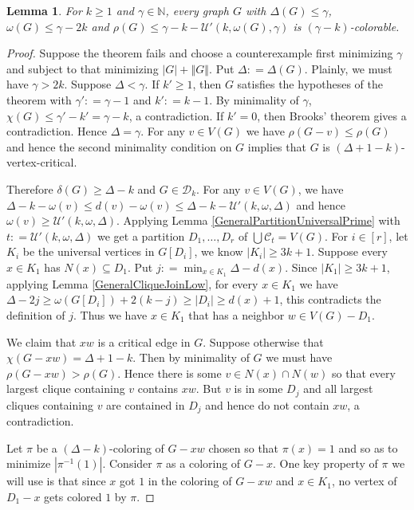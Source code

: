 \documentclass[12pt]{article}
\theoremstyle{plain}
\newtheorem{lem}[thm]{Lemma}
\theoremstyle{definition}
\theoremstyle{remark}
\newcommand{\fancy}[1]{\mathcal{#1}}
\newcommand{\IN}{\mathbb{N}}
\newcommand{\CC}{\fancy{C}}
\newcommand{\D}{\fancy{D}}
\newcommand{\card}[1]{\left|#1\right|}
\newcommand{\size}[1]{\left\Vert#1\right\Vert}
\newcommand{\irange}[1]{\left[#1\right]}
\newcommand{\DefinedAs}{\mathrel{\mathop:}=}
\def\D{\fancy{D}}
\begin{document}
\begin{lem}
For $k \geq 1$ and $\gamma \in \IN$, every graph $G$ with $\Delta(G) \leq \gamma$, $\omega(G) \leq \gamma - 2k$ and $\rho(G) \leq \gamma - k - \fancy{U}'(k, \omega(G), \gamma)$ is $(\gamma-k)$-colorable.
\end{lem}
\begin{proof}
Suppose the theorem fails and choose a counterexample first minimizing $\gamma$ and subject to that minimizing $\card{G} + \size{G}$. Put $\Delta \DefinedAs \Delta(G)$.  Plainly, we must have $\gamma > 2k$. Suppose $\Delta < \gamma$.  If $k' \geq 1$, then $G$ satisfies the hypotheses of the theorem with $\gamma' \DefinedAs \gamma - 1$ and $k' \DefinedAs k-1$.  By minimality of $\gamma$, $\chi(G) \leq \gamma'-k' = \gamma - k$, a contradiction.  If $k' = 0$, then Brooks' theorem gives a contradiction.  Hence $\Delta = \gamma$.  For any $v \in V(G)$ we have $\rho(G-v) \leq \rho(G)$ and hence the second minimality condition on $G$ implies that $G$ is $(\Delta + 1 - k)$-vertex-critical.

Therefore $\delta(G) \geq \Delta - k$ and $G \in \D_k$.  For any $v \in V(G)$, we have $\Delta - k - \omega(v) \leq d(v) - \omega(v) \leq \Delta - k - \fancy{U}'(k, \omega, \Delta)$ and hence $\omega(v) \geq  \fancy{U}'(k, \omega, \Delta)$. Applying Lemma \ref{GeneralPartitionUniversalPrime} with $t \DefinedAs \fancy{U}'(k, \omega, \Delta)$ we get a partition $D_1, \ldots, D_r$ of $\bigcup \CC_t = V(G)$.  For $i \in \irange{r}$, let $K_i$ be the universal vertices in $G[D_i]$, we know $\card{K_i} \geq 3k+1$.  Suppose every $x \in K_1$ has $N(x) \subseteq D_1$.  Put $j \DefinedAs \min_{x \in K_1} \Delta - d(x)$. Since $\card{K_1} \geq 3k+1$, applying Lemma \ref{GeneralCliqueJoinLow}, for every $x \in K_1$ we have $\Delta - 2j \geq \omega(G[D_i]) + 2(k-j) \geq \card{D_i} \geq d(x) + 1$, this contradicts the definition of $j$.  Thus we have $x \in K_1$ that has a neighbor $w \in V(G) - D_1$.

We claim that $xw$ is a critical edge in $G$.  Suppose otherwise that
$\chi(G - xw) = \Delta + 1 - k$.  Then by minimality of $G$ we must have $\rho(G-xw) >
\rho(G)$. Hence there is some $v \in N(x) \cap N(w)$ so that every
largest clique containing $v$ contains $xw$.  But $v$ is in some $D_j$ and all largest cliques containing $v$ are contained in $D_j$ and hence do not contain $xw$, a contradiction.  

Let $\pi$ be a $(\Delta-k)$-coloring of $G - xw$ chosen so that $\pi(x) = 1$
and so as to minimize $\card{\pi^{-1}(1)}$. Consider $\pi$ as a coloring of
$G-x$. One key property of $\pi$ we will use is that since $x$ got $1$ in the
coloring of $G - xw$ and $x \in K_1$, no vertex of $D_1 - x$ gets colored $1$ by $\pi$.


\end{proof}
\end{document}
